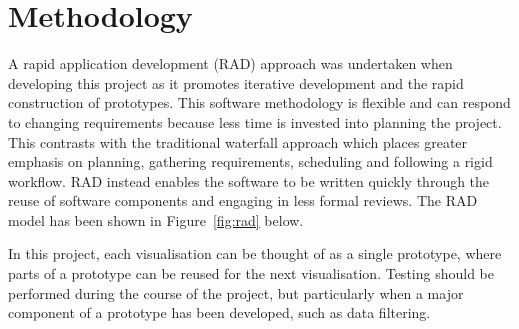 \section{Methodology} {
\label{sec:methodology}

	A rapid application development (RAD) approach was undertaken when developing this project as it promotes iterative development and the rapid construction of prototypes. This software methodology is flexible and can respond to changing requirements because less time is invested into planning the project. This contrasts with the traditional waterfall approach which places greater emphasis on planning, gathering requirements, scheduling and following a rigid workflow. RAD instead enables the software to be written quickly through the reuse of software components and engaging in less formal reviews. The RAD model has been shown in Figure~\ref{fig:rad} below.

	

	In this project, each visualisation can be thought of as a single prototype, where parts of a prototype can be reused for the next visualisation. Testing should be performed during the course of the project, but particularly when a major component of a prototype has been developed, such as data filtering.
		
}

